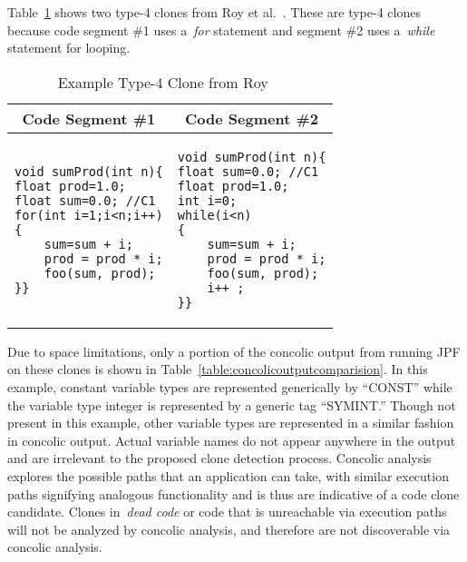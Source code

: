 \documentclass{sig-alternate}
\begin{document}
Table~\ref{table:royclones} shows two type-4 clones from Roy et al.~\cite{Roy:2009:CEC:1530898.1531101}. These are type-4 clones because code segment \#1 uses a~\emph{for} statement and segment \#2 uses a~\emph{while} statement for looping.


\noindent
\begin{table}[h] %
\centering
\caption{Example Type-4 Clone from Roy~\cite{Roy:2009:CEC:1530898.1531101}~\label{table:royclones}}
\begin{tabular}{ p{3.8cm} | p{3.8cm} }
\multicolumn{1}{c}{\textbf{Code Segment \#1}} & \multicolumn{1}{c}{\textbf{Code Segment \#2}} \\ \hline \hline
\begin{lstlisting}
void sumProd(int n){
float prod=1.0;
float sum=0.0; //C1
for(int i=1;i<n;i++)
{
    sum=sum + i;
    prod = prod * i;
    foo(sum, prod);
}}
\end{lstlisting}
&
\begin{lstlisting}
void sumProd(int n){
float sum=0.0; //C1
float prod=1.0;
int i=0;
while(i<n)
{
    sum=sum + i;
    prod = prod * i;
    foo(sum, prod);
    i++ ;
}}
\end{lstlisting}
\end{tabular}
\end{table}

Due to space limitations, only a portion of the concolic output from running JPF on these clones is shown in Table~\ref{table:concolicoutputcomparision}. In this example, constant variable types are represented generically by ``CONST'' while the variable type integer is represented by a generic tag ``SYMINT.'' Though not present in this example, other variable types are represented in a similar fashion in concolic output. Actual variable names do not appear anywhere in the output and are irrelevant to the proposed clone detection process. Concolic analysis explores the possible paths that an application can take, with similar execution paths signifying analogous functionality and is thus are indicative of a code clone candidate. Clones in~\emph{dead code} or code that is unreachable via execution paths will not be analyzed by concolic analysis, and therefore are not discoverable via concolic analysis.
\end{document}
